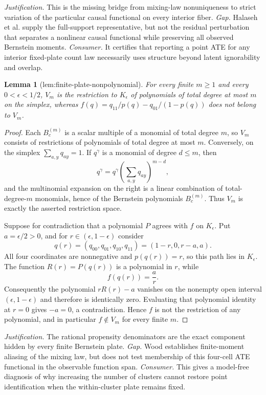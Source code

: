 \documentclass{article}
\newtheorem{lemma}{Lemma}
\begin{document}
\par\smallskip\noindent \textit{Justification.} This is the missing bridge from mixing-law nonuniqueness to strict variation of the particular causal functional on every interior fiber. \textit{Gap.} Halaseh et al. supply the full-support representative, but not the residual perturbation that separates a nonlinear causal functional while preserving all observed Bernstein moments. \textit{Consumer.} It certifies that reporting a point ATE for any interior fixed-plate count law necessarily uses structure beyond latent ignorability and overlap.

\begin{lemma}[lem:finite-plate-nonpolynomial]\label{lem:finite-plate-nonpolynomial}
For every finite \(m\ge1\) and every \(0<\epsilon<1/2\), \(V_m\) is the restriction to \(K_{\epsilon}\) of polynomials of total degree at most \(m\) on the simplex, whereas \(f(q)=q_{11}/p(q)-q_{01}/(1-p(q))\) does not belong to \(V_m\).
\end{lemma}
\begin{proof}
Each \(B_c^{(m)}\) is a scalar multiple of a monomial of total degree \(m\), so \(V_m\) consists of restrictions of polynomials of total degree at most \(m\).  Conversely, on the simplex \(\sum_{a,y}q_{ay}=1\).  If \(q^{\gamma}\) is a monomial of degree \(d\leq m\), then
\[
 q^{\gamma}=q^{\gamma}\left(\sum_{a,y}q_{ay}\right)^{m-d},
\]
and the multinomial expansion on the right is a linear combination of total-degree-\(m\) monomials, hence of the Bernstein polynomials \(B_c^{(m)}\).  Thus \(V_m\) is exactly the asserted restriction space.

Suppose for contradiction that a polynomial \(P\) agrees with \(f\) on \(K_{\epsilon}\).  Put \(a=\epsilon/2>0\), and for \(r\in(\epsilon,1-\epsilon)\) consider
\[
 q(r)=(q_{00},q_{01},q_{10},q_{11})=(1-r,0,r-a,a).
\]
All four coordinates are nonnegative and \(p(q(r))=r\), so this path lies in \(K_{\epsilon}\).  The function \(R(r)=P(q(r))\) is a polynomial in \(r\), while
\[
 f(q(r))=\frac{a}{r}.
\]
Consequently the polynomial \(rR(r)-a\) vanishes on the nonempty open interval \((\epsilon,1-\epsilon)\) and therefore is identically zero.  Evaluating that polynomial identity at \(r=0\) gives \(-a=0\), a contradiction.  Hence \(f\) is not the restriction of any polynomial, and in particular \(f\notin V_m\) for every finite \(m\).
\end{proof}
\par\smallskip\noindent \textit{Justification.} The rational propensity denominators are the exact component hidden by every finite Bernstein plate. \textit{Gap.} Wood establishes finite-moment aliasing of the mixing law, but does not test membership of this four-cell ATE functional in the observable function span. \textit{Consumer.} This gives a model-free diagnosis of why increasing the number of clusters cannot restore point identification when the within-cluster plate remains fixed.
\end{document}
